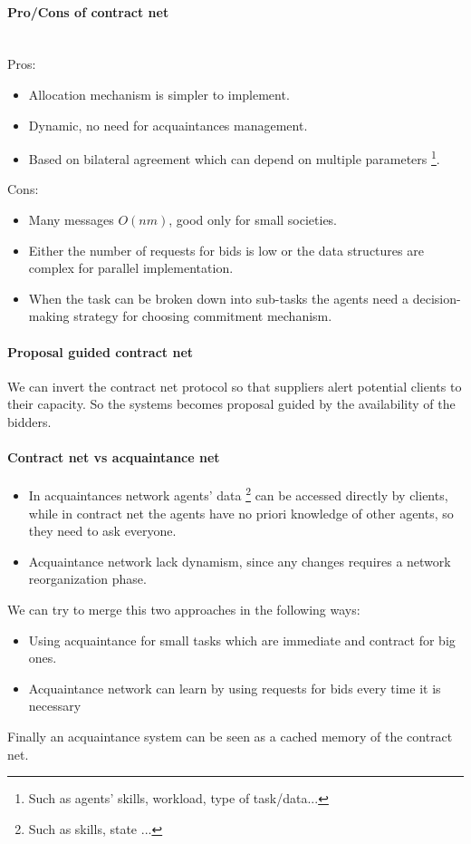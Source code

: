 \documentclass[10pt,a4paper]{article}
\begin{document}
\paragraph{Pro/Cons of contract net}
\\
Pros:
\begin{itemize}
\item Allocation mechanism is simpler to implement.
\item Dynamic, no need for acquaintances management.
\item Based on bilateral agreement which can depend on multiple parameters \footnote{Such as agents' skills, workload, type of task/data...}.
\end{itemize}

Cons:
\begin{itemize}
\item Many messages $O(nm)$, good only for small societies.
\item Either the number of requests for bids is low or the data structures are complex for parallel implementation.
\item When the task can be broken down into sub-tasks the agents need a decision-making strategy for choosing commitment mechanism.
\end{itemize}


\paragraph{Proposal guided contract net}
We can invert the contract net protocol so that suppliers alert potential clients to their capacity. So the systems becomes proposal guided by the availability of the bidders.


\paragraph{Contract net vs acquaintance net}

\begin{itemize}
\item In acquaintances network agents' data \footnote{Such as skills, state ...} can be accessed directly by clients, while in contract net the agents have no priori knowledge of other agents, so they need to ask everyone. 
\item Acquaintance network lack dynamism, since any changes requires a network reorganization phase. 
\end{itemize}

We can try to merge this two approaches in the following ways:
\begin{itemize}
\item Using acquaintance for small tasks which are immediate and contract for big ones.
\item Acquaintance network can learn by using requests for bids every time it is necessary
\end{itemize}
Finally an acquaintance system can be seen as a cached memory of the contract net.
\end{document}
